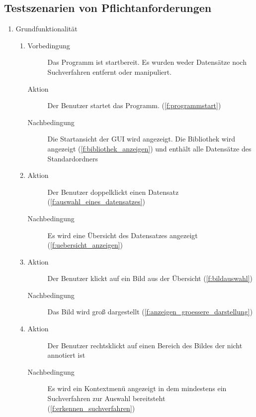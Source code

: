 \subsection{Testszenarien von Pflichtanforderungen}
\begin{enumerate} [label=\bfseries /TS \arabic*0/, leftmargin=*]
	\item Grundfunktionalität %
	\begin{enumerate}
		\item
		\begin{description}
			\item[Vorbedingung] Das Programm ist startbereit. Es wurden weder Datensätze noch Suchverfahren entfernt oder manipuliert.
			\item[Aktion] Der Benutzer startet das Programm. (\ref{f:programmstart})
			\item[Nachbedingung] Die Startansicht der GUI wird angezeigt. Die Bibliothek wird angezeigt (\ref{f:bibliothek_anzeigen}) und enthält alle Datensätze des Standardordners
		\end{description}
		\item
		\begin{description}
			\item[Aktion] Der Benutzer doppelklickt einen Datensatz (\ref{f:auswahl_eines_datensatzes})
			\item[Nachbedingung] Es wird eine Übersicht des Datensatzes angezeigt (\ref{f:uebersicht_anzeigen})
		\end{description}
		\item
		\begin{description}
			\item[Aktion] Der Benutzer klickt auf ein Bild aus der Übersicht (\ref{f:bildauswahl})
			\item[Nachbedingung] Das Bild wird groß dargestellt (\ref{f:anzeigen_groessere_darstellung})
		\end{description}
		\item
		\begin{description}
			\item[Aktion] Der Benutzer rechtsklickt auf einen Bereich des Bildes der nicht annotiert ist
			\item[Nachbedingung] Es wird ein Kontextmenü angezeigt in dem mindestens ein Suchverfahren zur Auswahl bereitsteht (\ref{f:erkennen_suchverfahren})
		\end{description}

\end{enumerate}
\end{enumerate}
